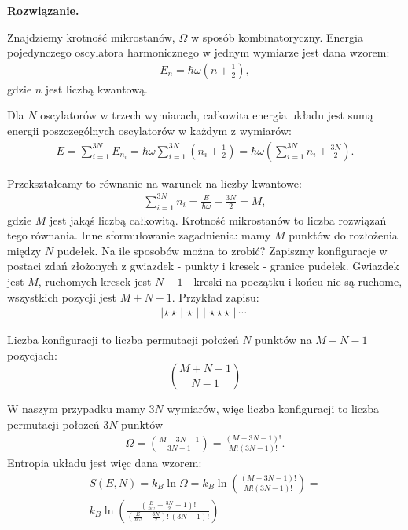 \documentclass[11pt,a4paper]{article}
\newenvironment{solution}{\vspace{1cm} \par\textbf{Rozwiązanie.} \vspace{1cm}}{}
\begin{document}
\begin{solution}

Znajdziemy krotność mikrostanów, $\Omega$ w sposób kombinatoryczny. 
Energia pojedynczego oscylatora harmonicznego w jednym wymiarze jest dana wzorem:
\begin{align*}
E_n = \hbar \omega \left( n + \frac{1}{2} \right),
\end{align*}
gdzie $n$ jest liczbą kwantową. 

Dla $N$ oscylatorów w trzech wymiarach, całkowita energia układu jest 
sumą energii poszczególnych oscylatorów w każdym z wymiarów:
\begin{align*}
E = \sum_{i=1}^{3N} E_{n_i} = \hbar \omega \sum_{i=1}^{3N} \left( n_i + \frac{1}{2} \right) = \hbar \omega \left( \sum_{i=1}^{3N} n_i + \frac{3N}{2} \right).
\end{align*}

Przekształcamy to równanie na warunek na liczby kwantowe:
\begin{align*}
  \sum_{i=1}^{3N} n_i = \frac{E}{\hbar \omega} - \frac{3N}{2} = M,
\end{align*}
gdzie $M$ jest jakąś liczbą całkowitą. 
Krotność mikrostanów to liczba rozwiązań tego równania.
Inne sformułowanie zagadnienia: mamy $M$ punktów do rozłożenia 
między $N$ pudełek. Na ile sposobów można to zrobić? 
Zapiszmy konfiguracje w postaci zdań złożonych z 
gwiazdek - punkty i kresek - granice pudełek.
Gwiazdek jest $M$, ruchomych kresek jest $N-1$ - 
kreski na początku i końcu nie są ruchome, wszystkich pozycji 
jest $M+N-1$. Przykład zapisu:
\begin{align*}
|\star\star\,|\,\star\,|\,\,|\,\star\star\star\,|\,\cdots|
\end{align*}

Liczba konfiguracji to liczba permutacji położeń $N$ punktów 
na $M+N-1$ pozycjach:
\[
\binom{M+N-1}{N-1}
\]

W naszym przypadku mamy $3N$ wymiarów, więc liczba 
konfiguracji to liczba permutacji położeń $3N$ punktów
\begin{align*}
\Omega = \binom{M+3N-1}{3N-1} = \frac{(M+3N-1)!}{M!(3N-1)!}.
\end{align*}
Entropia układu jest więc dana wzorem:
\begin{align*}
S(E,N) = k_B \ln \Omega = k_B \ln \left(\frac{(M+3N-1)!}{M!(3N-1)!}\right) = \\
k_B \ln \left(\frac{\left(\frac{E}{\hbar \omega} + \frac{3N}{2} - 1\right)!}{\left(\frac{E}{\hbar \omega} - \frac{3N}{2}\right)!\,(3N-1)!}\right)
\end{align*}


\end{solution}
\end{document}
